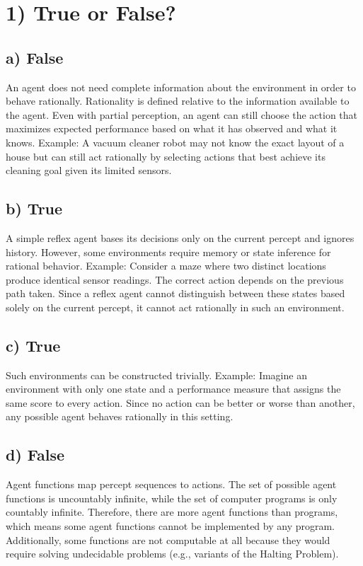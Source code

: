 \documentclass[12pt]{scrartcl}
\begin{document}

\section*{1) True or False?}
     \subsection*{a) False}
    An agent does not need complete information about the environment in order to behave rationally.   Rationality is defined relative to the information available to the agent. Even with partial  perception, an agent can
    still choose the action that maximizes expected performance based on what it has observed and what it knows.
    Example: A vacuum cleaner robot may not know the exact layout of a house but can still act rationally by selecting actions that best achieve its cleaning goal given its limited sensors.

    \subsection*{b) True}
     A simple reflex agent bases its decisions only on the current percept and ignores history. However, some environments require memory or state inference for rational behavior.   
     Example: Consider a maze where two distinct locations produce identical sensor readings. The correct action depends on the previous path taken. Since a reflex agent cannot distinguish between these states based solely
     on the current percept, it cannot act rationally in such an environment.

    \subsection*{c) True}
    Such environments can be constructed trivially.
    Example: Imagine an environment with only one state and a performance measure that assigns the
    same score to every action. Since no action can be better or worse than another, any possible
    agent behaves rationally in this setting.

    \subsection*{d) False}
    Agent functions map percept sequences to actions. The set of possible agent functions is uncountably infinite, while the set of computer programs is only countably infinite. Therefore, there are more agent functions
    than programs, which means some agent functions cannot be implemented by any program. Additionally, some functions are not computable at all because they would require solving undecidable problems (e.g., variants of
    the Halting Problem).
    
\end{document}
